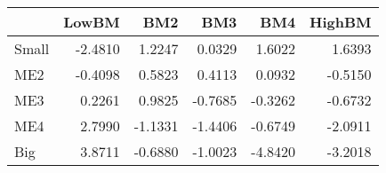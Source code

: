 \begin{tabular}{lrrrrr}
\toprule
{} &   LowBM &     BM2 &     BM3 &     BM4 &  HighBM \\
\midrule
Small & -2.4810 &  1.2247 &  0.0329 &  1.6022 &  1.6393 \\
ME2   & -0.4098 &  0.5823 &  0.4113 &  0.0932 & -0.5150 \\
ME3   &  0.2261 &  0.9825 & -0.7685 & -0.3262 & -0.6732 \\
ME4   &  2.7990 & -1.1331 & -1.4406 & -0.6749 & -2.0911 \\
Big   &  3.8711 & -0.6880 & -1.0023 & -4.8420 & -3.2018 \\
\bottomrule
\end{tabular}
